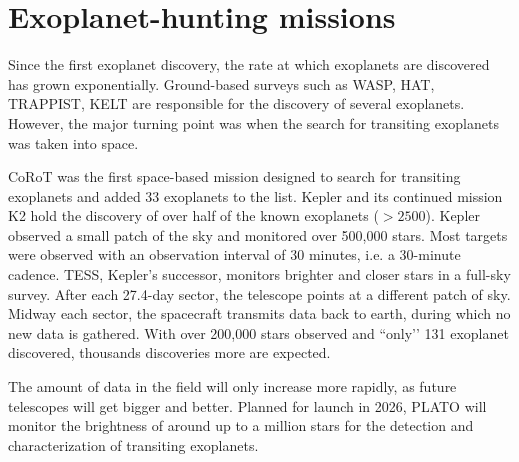 
\section{Exoplanet-hunting missions}

Since the first exoplanet discovery, the rate at which exoplanets are discovered has grown exponentially. Ground-based surveys such as WASP, HAT, TRAPPIST, KELT  are responsible for the discovery of several exoplanets. However, the major turning point was when the search for transiting exoplanets was taken into space.

CoRoT was the first space-based mission designed to search for transiting exoplanets and added 33 exoplanets to the list. Kepler and its continued mission K2 hold the discovery of over half of the known exoplanets ($>2500$).
Kepler observed a small patch of the sky and monitored over 500,000 stars. Most targets were observed with an observation interval of 30 minutes, i.e. a 30-minute cadence. TESS, Kepler’s successor, monitors brighter and closer stars in a full-sky survey. After each 27.4-day sector, the telescope points at a different patch of sky. Midway each sector, the spacecraft transmits data back to earth, during which no new data is gathered. With over 200,000 stars observed and ``only’’ 131 exoplanet discovered, thousands discoveries more are expected.

The amount of data in the field will only increase more rapidly, as future telescopes will get bigger and better.
Planned for launch in 2026, PLATO will monitor the brightness of around up to a million stars for the detection and characterization of transiting exoplanets.
